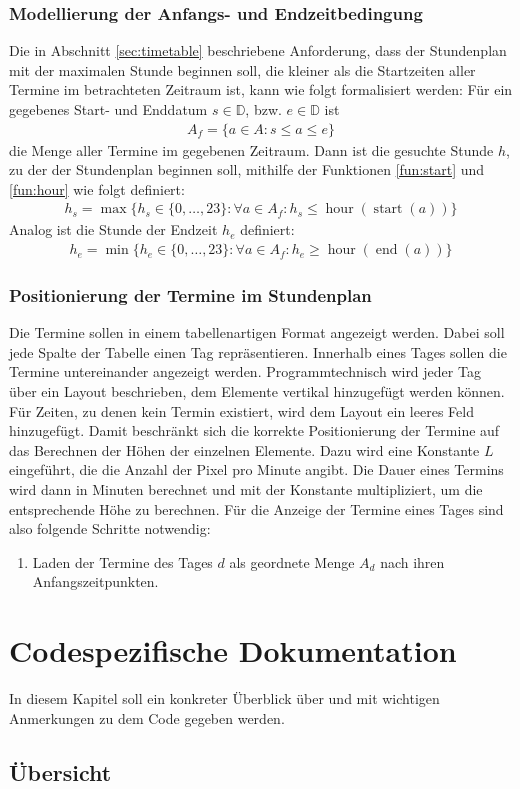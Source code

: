\documentclass[noindent]{tudreport}
\DeclareMathOperator{\start}{start}
\DeclareMathOperator{\getEnd}{end}
\DeclareMathOperator{\hour}{hour}
\begin{document}
			\subsection{Modellierung der Anfangs- und Endzeitbedingung}
				Die in Abschnitt \ref{sec:timetable} beschriebene Anforderung, dass der Stundenplan mit der maximalen Stunde beginnen soll, die kleiner als die Startzeiten aller Termine im betrachteten Zeitraum ist, kann wie folgt formalisiert werden: Für ein gegebenes Start- und Enddatum $s \in \mathbb{D}$, bzw. $e \in \mathbb{D}$ ist
				\begin{align}
A_f = \{a \in A: s \leq a \leq e\}
				\end{align}
				die Menge aller Termine im gegebenen Zeitraum. Dann ist die gesuchte Stunde $h$, zu der der Stundenplan beginnen soll, mithilfe der Funktionen \ref{fun:start} und \ref{fun:hour} wie folgt definiert:
				\begin{align}
h_s = \max\{h_s \in \{0, \dots, 23\}: \forall a \in A_f: h_s \leq \hour(\start(a)) \}
				\end{align}
				Analog ist die Stunde der Endzeit $h_e$ definiert:
				\begin{align}
h_e = \min\{h_e \in \{0, \dots, 23\}: \forall a \in A_f: h_e \geq \hour(\getEnd(a)) \}
				\end{align}
			
			\subsection{Positionierung der Termine im Stundenplan}
				Die Termine sollen in einem tabellenartigen Format angezeigt werden. Dabei soll jede Spalte der Tabelle einen Tag repräsentieren. Innerhalb eines Tages sollen die Termine untereinander angezeigt werden. Programmtechnisch wird jeder Tag über ein Layout beschrieben, dem Elemente vertikal hinzugefügt werden können. Für Zeiten, zu denen kein Termin existiert, wird dem Layout ein leeres Feld hinzugefügt. Damit beschränkt sich die korrekte Positionierung der Termine auf das Berechnen der Höhen der einzelnen Elemente. Dazu wird eine Konstante $L$ eingeführt, die die Anzahl der Pixel pro Minute angibt. Die Dauer eines Termins wird dann in Minuten berechnet und mit der Konstante multipliziert, um die entsprechende Höhe zu berechnen. Für die Anzeige der Termine eines Tages sind also folgende Schritte notwendig:
				\begin{enumerate}
					\item Laden der Termine des Tages $d$ als geordnete Menge $A_d$ nach ihren Anfangszeitpunkten.
				\end{enumerate}
	
	\chapter{Codespezifische Dokumentation}
		In diesem Kapitel soll ein konkreter Überblick über und mit wichtigen Anmerkungen zu dem Code gegeben werden.
		
		\section{Übersicht}
			
\end{document}
